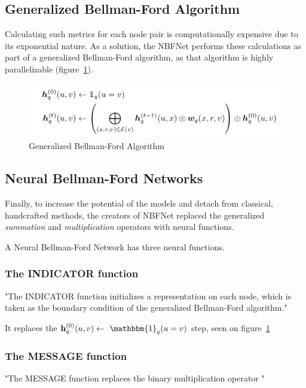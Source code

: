 \subsection{Generalized Bellman-Ford Algorithm}\label{subsec:generalized-bellman-ford-algorithm}

Calculating such metrics for each node pair is computationally expensive due to its exponential nature.
As a solution, the NBFNet performs these calculations as part of a generalized Bellman-Ford algorithm, as that algorithm is highly
parallelizable (figure~\ref{fig:gen-bf}).

\begin{figure}[h] %
    \centering %
    \includegraphics[width=0.8\linewidth]{figures/nbfnet-gen-bf} %
    \caption{Generalized Bellman-Ford Algorithm ~\cite{NBFNet}} %
    \label{fig:gen-bf} %
\end{figure}

\subsection{Neural Bellman-Ford Networks}\label{subsec:neural-bellman-ford-networks}
Finally, to increase the potential of the models and detach from classical, handcrafted methods, the creators of NBFNet replaced
the generalized \textit{summation} and \textit{multiplication} operators with neural functions.

A Neural Bellman-Ford Network has three neural functions.

\subsubsection{The INDICATOR function}
"The INDICATOR function initializes a
representation on each node, which is
taken as the boundary condition of the generalized Bellman-Ford algorithm."~\cite{NBFNet}

It replaces the $\textbf{h}_q^{(0)}(u,v)\leftarrow\ \mathbbm{1}_q(u=v)$ step, seen on figure~\ref{fig:gen-bf}

\subsubsection{The MESSAGE function}
"The MESSAGE function replaces the binary multiplication operator \bigotimes"~\cite{NBFNet}


